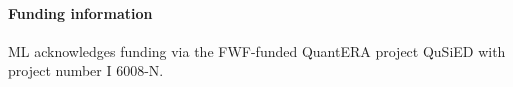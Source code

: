 \documentclass{SciPost}
\begin{document}
\paragraph{Funding information}
ML acknowledges funding via the FWF-funded QuantERA project QuSiED with project number I 6008-N.





\end{document}
